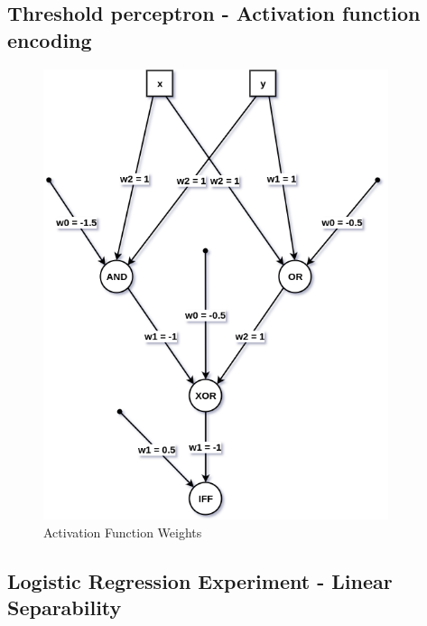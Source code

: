 \documentclass[a4paper]{article}
\begin{document}
\subsection{Threshold perceptron - Activation function encoding}
\begin{figure}[h]
    \centering
    \includegraphics[width=0.9\textwidth]{images/activation_functions.png}
    \caption{Activation Function Weights}
    \label{fig_activation_function_weights}
\end{figure}

\newpage

\subsection{Logistic Regression Experiment - Linear Separability}
\end{document}
